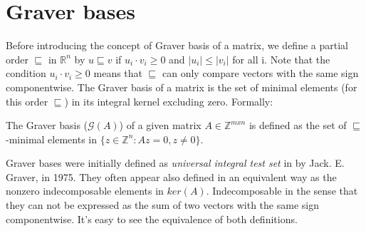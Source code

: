 \chapter{Graver bases} \label{literature}



Before introducing the concept of Graver basis of a matrix, we define a partial order $\sqsubseteq$ in $\mathbb{R}^n$ by $u \sqsubseteq v$ if $u_i \cdot v_i \geq 0$ and $|u_i| \leq |v_i|$ for all i. Note that the condition $u_i \cdot v_i \geq 0$ means that $\sqsubseteq$ can only compare vectors with the same sign componentwise. The Graver basis of a matrix is the set of minimal elements (for this order $\sqsubseteq$) in its integral kernel excluding zero. Formally: 

\begin{definition}
The Graver basis ($\mathcal{G}(A)$) of a given matrix $A \in \mathbb{Z}^{mxn}$ is defined as the set of $\sqsubseteq$-minimal elements in $\{z \in \mathbb{Z}^n: Az = 0, z\neq0\}$.%
\end{definition}

Graver bases were initially defined as \textit{universal integral test set} in \cite{GRAVER:1975} by Jack. E. Graver, in 1975. They often appear also defined in an equivalent way as the nonzero indecomposable elements in $ker(A)$. Indecomposable in the sense that they can not be expressed as the sum of two vectors with the same sign componentwise. It's easy to see the equivalence of both definitions.



